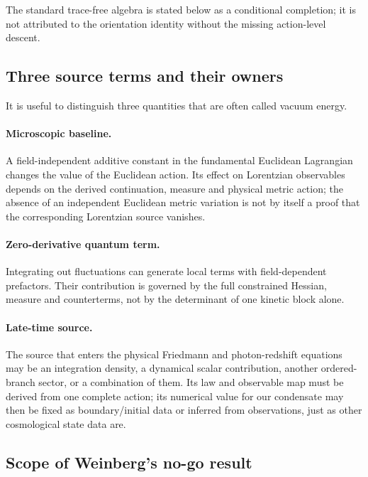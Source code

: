 The standard trace-free algebra is stated below as a conditional completion;
it is not attributed to the orientation identity without the missing
action-level descent.

\subsection{Three source terms and their owners}
\label{subsec:three_objects}

It is useful to distinguish three quantities that are often called vacuum
energy.

\paragraph{Microscopic baseline.}
A field-independent additive constant in the fundamental Euclidean
Lagrangian changes the value of the Euclidean action.  Its effect on
Lorentzian observables depends on the derived continuation, measure and
physical metric action; the absence of an independent Euclidean metric
variation is not by itself a proof that the corresponding Lorentzian source
vanishes.

\paragraph{Zero-derivative quantum term.}
Integrating out fluctuations can generate local terms with field-dependent
prefactors.  Their contribution is governed by the full constrained
Hessian, measure and counterterms, not by the determinant of one kinetic
block alone.

\paragraph{Late-time source.}
The source that enters the physical Friedmann and photon-redshift equations
may be an integration density, a dynamical scalar contribution, another
ordered-branch sector, or a combination of them.  Its law and observable map
must be derived from one complete action; its numerical value for our
condensate may then be fixed as boundary/initial data or inferred from
observations, just as other cosmological state data are.

\subsection{Scope of Weinberg's no-go result}
\label{subsec:weinberg_cc}

